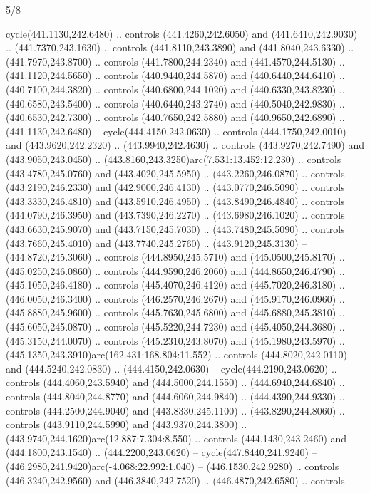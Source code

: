 \begin{flagdescription}{5/8}
\begin{scope}[xshift=0.5\flaglength,yshift=0.5\flagwidth,scale=\flagwidth/475.63]
\begin{scope}[y=0.8pt, x=0.8pt, yscale=-1, xscale=1,shift={(-450,-300)}]
\begin{scope}[cm={{1.0,0.0,0.0,1.0,(-0.0002,0.12556)}},cm={{1.0,0.0,0.0,1.0,(0.00179,0.0)}}]
\begin{scope}[cm={{1.00926,0.0,0.0,1.00926,(-3.1541,-2.47648)}}]
  cycle(441.1130,242.6480) .. controls (441.4260,242.6050) and
  (441.6410,242.9030) .. (441.7370,243.1630) .. controls (441.8110,243.3890) and
  (441.8040,243.6330) .. (441.7970,243.8700) .. controls (441.7800,244.2340) and
  (441.4570,244.5130) .. (441.1120,244.5650) .. controls (440.9440,244.5870) and
  (440.6440,244.6410) .. (440.7100,244.3820) .. controls (440.6800,244.1020) and
  (440.6330,243.8230) .. (440.6580,243.5400) .. controls (440.6440,243.2740) and
  (440.5040,242.9830) .. (440.6530,242.7300) .. controls (440.7650,242.5880) and
  (440.9650,242.6890) .. (441.1130,242.6480) -- cycle(444.4150,242.0630) ..
  controls (444.1750,242.0010) and (443.9620,242.2320) .. (443.9940,242.4630) ..
  controls (443.9270,242.7490) and (443.9050,243.0450) ..
  (443.8160,243.3250)arc(7.531:13.452:12.230) .. controls (443.4780,245.0760)
  and (443.4020,245.5950) .. (443.2260,246.0870) .. controls (443.2190,246.2330)
  and (442.9000,246.4130) .. (443.0770,246.5090) .. controls (443.3330,246.4810)
  and (443.5910,246.4950) .. (443.8490,246.4840) .. controls (444.0790,246.3950)
  and (443.7390,246.2270) .. (443.6980,246.1020) .. controls (443.6630,245.9070)
  and (443.7150,245.7030) .. (443.7480,245.5090) .. controls (443.7660,245.4010)
  and (443.7740,245.2760) .. (443.9120,245.3130) -- (444.8720,245.3060) ..
  controls (444.8950,245.5710) and (445.0500,245.8170) .. (445.0250,246.0860) ..
  controls (444.9590,246.2060) and (444.8650,246.4790) .. (445.1050,246.4180) ..
  controls (445.4070,246.4120) and (445.7020,246.3180) .. (446.0050,246.3400) ..
  controls (446.2570,246.2670) and (445.9170,246.0960) .. (445.8880,245.9600) ..
  controls (445.7630,245.6800) and (445.6880,245.3810) .. (445.6050,245.0870) ..
  controls (445.5220,244.7230) and (445.4050,244.3680) .. (445.3150,244.0070) ..
  controls (445.2310,243.8070) and (445.1980,243.5970) ..
  (445.1350,243.3910)arc(162.431:168.804:11.552) .. controls (444.8020,242.0110)
  and (444.5240,242.0830) .. (444.4150,242.0630) -- cycle(444.2190,243.0620) ..
  controls (444.4060,243.5940) and (444.5000,244.1550) .. (444.6940,244.6840) ..
  controls (444.8040,244.8770) and (444.6060,244.9840) .. (444.4390,244.9330) ..
  controls (444.2500,244.9040) and (443.8330,245.1100) .. (443.8290,244.8060) ..
  controls (443.9110,244.5990) and (443.9370,244.3800) ..
  (443.9740,244.1620)arc(12.887:7.304:8.550) .. controls (444.1430,243.2460) and
  (444.1800,243.1540) .. (444.2200,243.0620) -- cycle(447.8440,241.9240) --
  (446.2980,241.9420)arc(-4.068:22.992:1.040) -- (446.1530,242.9280) .. controls
  (446.3240,242.9560) and (446.3840,242.7520) .. (446.4870,242.6580) .. controls

\end{scope}
\end{scope}
\end{scope}
\end{scope}
\end{flagdescription}
